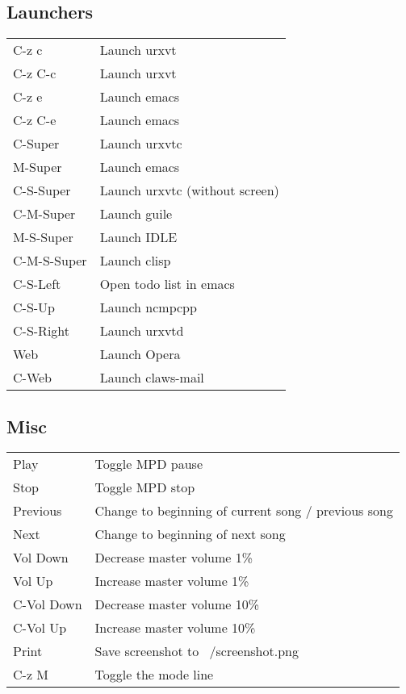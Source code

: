 \documentclass[10pt,a4paper,oneside]{article}
\begin{document}
\subsection{Launchers}
\begin{center}
  \begin{tabular}{|l|l|}
    \hline
    C-z c       & Launch urxvt\\
    C-z C-c     & Launch urxvt\\
    C-z e       & Launch emacs\\
    C-z C-e     & Launch emacs\\
    C-Super     & Launch urxvtc\\
    M-Super     & Launch emacs\\
    C-S-Super   & Launch urxvtc (without screen)\\
    C-M-Super   & Launch guile\\
    M-S-Super   & Launch IDLE\\
    C-M-S-Super & Launch clisp\\
    C-S-Left    & Open todo list in emacs\\
    C-S-Up      & Launch ncmpcpp\\
    C-S-Right   & Launch urxvtd\\
    Web         & Launch Opera\\
    C-Web       & Launch claws-mail\\
    \hline
  \end{tabular}
\end{center}

\subsection{Misc}
\begin{center}
  \begin{tabular}{|l|l|}
    \hline
    Play       & Toggle MPD pause\\
    Stop       & Toggle MPD stop\\
    Previous   & Change to beginning of current song / previous song\\
    Next       & Change to beginning of next song\\
    Vol Down   & Decrease master volume 1\%\\
    Vol Up     & Increase master volume 1\%\\
    C-Vol Down & Decrease master volume 10\%\\
    C-Vol Up   & Increase master volume 10\%\\
    Print      & Save screenshot to ~/screenshot.png\\
    C-z M      & Toggle the mode line\\
    \hline
  \end{tabular}
\end{center}
\end{document}
